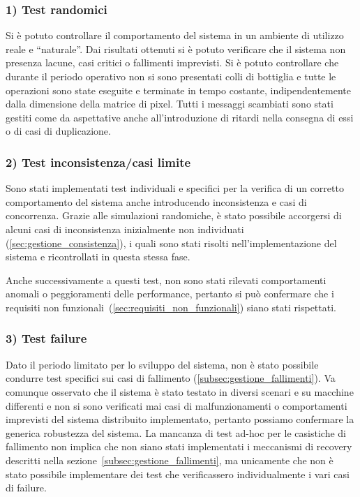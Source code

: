 \documentclass[12pt, a4paper]{report}
\begin{document}
\subsubsection{1) Test randomici}

Si \`e potuto controllare il comportamento del sistema in un ambiente di utilizzo reale e ``naturale''.
Dai risultati ottenuti si \`e potuto verificare che il sistema non presenza lacune, casi critici o fallimenti imprevisti. Si \`e potuto controllare che durante il periodo operativo non si sono presentati colli di bottiglia e tutte le operazioni sono state eseguite e terminate in tempo costante, indipendentemente dalla dimensione della matrice di pixel.
Tutti i messaggi scambiati sono stati gestiti come da aspettative anche all'introduzione di ritardi nella consegna di essi o di casi di duplicazione.

\subsubsection{2) Test inconsistenza/casi limite}

Sono stati implementati test individuali e specifici per la verifica di un corretto comportamento del sistema anche introducendo inconsistenza e casi di concorrenza.
Grazie alle simulazioni randomiche, \`e stato possibile accorgersi di alcuni casi di inconsistenza inizialmente non individuati (\ref{sec:gestione_consistenza}), i quali sono stati risolti nell'implementazione del sistema e ricontrollati in questa stessa fase.

Anche successivamente a questi test, non sono stati rilevati comportamenti anomali o peggioramenti delle performance, pertanto si pu\`o confermare che i requisiti non funzionali~(\ref{sec:requisiti_non_funzionali}) siano stati rispettati.

\subsubsection{3) Test failure}

Dato il periodo limitato per lo sviluppo del sistema, non \`e stato possibile condurre test specifici sui casi di fallimento (\ref{subsec:gestione_fallimenti}).
Va comunque osservato che il sistema \`e stato testato in diversi scenari e su macchine differenti e non si sono verificati mai casi di malfunzionamenti o comportamenti imprevisti del sistema distribuito implementato, pertanto possiamo confermare la generica robustezza del sistema.
La mancanza di test ad-hoc per le casistiche di fallimento non implica che non siano stati implementati i meccanismi di recovery descritti nella sezione~\ref{subsec:gestione_fallimenti}, ma unicamente che non \`e stato possibile implementare dei test che verificassero individualmente i vari casi di failure.
\end{document}
